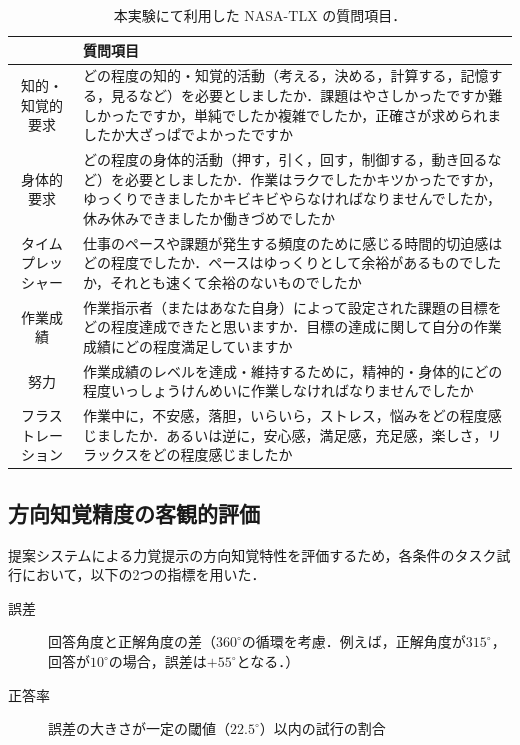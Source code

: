 \documentclass[a4paper,11pt]{jreport}
\begin{document}
\begin{table}[hbt]
\caption{ 本実験にて利用した NASA-TLX の質問項目．}
\label{table:nasa-tlx}
\begin{center}
\begin{tabular}{ c | p{11cm} }
\hline
 & 質問項目\\
\hline
\hline
知的・知覚的要求 & どの程度の知的・知覚的活動（考える，決める，計算する，記憶する，見るなど）を必要としましたか．課題はやさしかったですか難しかったですか，単純でしたか複雑でしたか，正確さが求められましたか大ざっぱでよかったですか \\
\hline
身体的要求 & どの程度の身体的活動（押す，引く，回す，制御する，動き回るなど）を必要としましたか．作業はラクでしたかキツかったですか，ゆっくりできましたかキビキビやらなければなりませんでしたか，休み休みできましたか働きづめでしたか \\
\hline
タイムプレッシャー & 仕事のペースや課題が発生する頻度のために感じる時間的切迫感はどの程度でしたか．ペースはゆっくりとして余裕があるものでしたか，それとも速くて余裕のないものでしたか \\
\hline
作業成績 & 作業指示者（またはあなた自身）によって設定された課題の目標をどの程度達成できたと思いますか．目標の達成に関して自分の作業成績にどの程度満足していますか \\
\hline 
努力 & 作業成績のレベルを達成・維持するために，精神的・身体的にどの程度いっしょうけんめいに作業しなければなりませんでしたか \\
\hline 
フラストレーション &  作業中に，不安感，落胆，いらいら，ストレス，悩みをどの程度感じましたか．あるいは逆に，安心感，満足感，充足感，楽しさ，リラックスをどの程度感じましたか \\
\hline 
\end{tabular}
\end{center}
\end{table}

\subsection{方向知覚精度の客観的評価}
提案システムによる力覚提示の方向知覚特性を評価するため，各条件のタスク試行において，以下の2つの指標を用いた．

\begin{description}
    \item[誤差] 回答角度と正解角度の差（$360^\circ$の循環を考慮．例えば，正解角度が$315^\circ$，回答が$10^\circ$の場合，誤差は$+55^\circ$となる．）
    \item[正答率] 誤差の大きさが一定の閾値（$22.5^\circ$）以内の試行の割合
\end{description}
\end{document}
